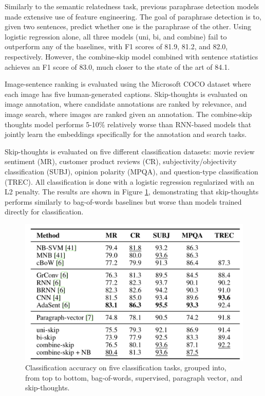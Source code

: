 Similarly to the semantic relatedness task, previous paraphrase detection models made extensive use of feature engineering. The goal of paraphrase detection is to, given two sentences, predict whether one is the paraphrase of the other. Using logistic regression alone, all three models (uni, bi, and combine) fail to outperform any of the baselines, with F1 scores of 81.9, 81.2, and 82.0, respectively. However,  the combine-skip model combined with sentence statistics achieves an F1 score of 83.0, much closer to the state of the art of 84.1.

Image-sentence ranking is evaluated using the Microsoft COCO dataset where each image has five human-generated captions. Skip-thoughts is evaluated on image annotation, where candidate annotations are ranked by relevance, and image search, where images are ranked given an annotation. The combine-skip thoughts model performs 5-10\% relatively worse than RNN-based models that jointly learn the embeddings specifically for the annotation and search tasks. 

Skip-thoughts is evaluated on five different classification datasets: movie review sentiment (MR), customer product reviews (CR), subjectivity/objectivity classification (SUBJ), opinion polarity (MPQA), and question-type classification (TREC). All classification is done with a logistic regression regularized with an L2 penalty. The results are shown in Figure \ref{fig:skipthoughts-res-f}, demonstrating that skip-thoughts performs similarly to bag-of-words baselines but worse than models trained directly for classification.


\begin{figure}[h!]
\centering
  \includegraphics[width=.7\linewidth]{files/skipthoughts-8.png}
  \caption{Classification accuracy on five classification tasks, grouped into, from top to bottom, bag-of-words, supervised, paragraph vector, and skip-thoughts.}
  \label{fig:skipthoughts-res-f}
\end{figure}

